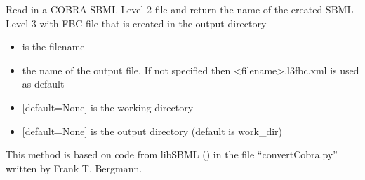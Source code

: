 \documentclass[letterpaper,10pt,english]{sphinxmanual}
\begin{document}

\begin{fulllineitems}
\label{\detokenize{modules_doc:cbmpy.CBXML.sbml_convertCOBRASBMLtoFBC}}
\pysigstartsignatures
{}
\pysigstopsignatures
\sphinxAtStartPar
Read in a COBRA SBML Level 2 file and return the name of the created SBML Level 3 with FBC
file that is created in the output directory
\begin{itemize}
\item {} 
\sphinxAtStartPar
{} is the filename

\item {} 
\sphinxAtStartPar
{} the name of the output file. If not specified then \textless{}filename\textgreater{}.l3fbc.xml is used as default

\item {} 
\sphinxAtStartPar
{} {[}default=None{]} is the working directory

\item {} 
\sphinxAtStartPar
{} {[}default=None{]} is the output directory (default is work\_dir)

\end{itemize}

\sphinxAtStartPar
This method is based on code from libSBML () in the file “convertCobra.py”
written by Frank T. Bergmann.

\end{fulllineitems}

\end{document}
